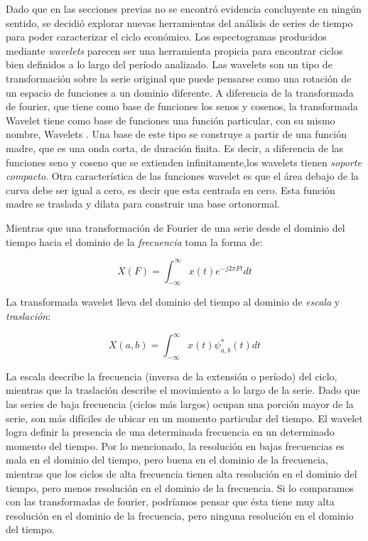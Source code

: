 \documentclass[a4paper]{article}
\begin{document}
Dado que en las secciones previas no se encontró evidencia concluyente en ningún sentido, se decidió explorar nuevas herramientas del análisis de series de tiempo para poder caracterizar el ciclo económico. Los espectogramas producidos mediante \textit{wavelets} parecen ser una herramienta propicia para encontrar ciclos bien definidos a lo largo del período analizado. Las wavelets son un tipo de transformación sobre la serie original que puede pensarse como una rotación de un espacio de funciones a un dominio diferente. A diferencia de la transformada de fourier, que tiene como base de funciones los senos y cosenos, la transformada Wavelet tiene como base de funciones una función particular, con su mismo nombre, Wavelets \cite{castro1995wavelets}. Una base de este tipo se construye a partir de una función madre, que es una onda corta, de duración finita. Es decir, a diferencia de las funciones seno y coseno que se extienden infinitamente,los wavelets tienen \textit{soporte compacto}. Otra característica de las funciones wavelet es que el área debajo de la curva debe ser igual a cero, es decir que esta centrada en cero. Esta función madre se traslada y dilata para construir una base ortonormal. 

Mientras que una transformación de Fourier de una serie desde el dominio del tiempo hacia el dominio de la \textit{frecuencia} toma la forma de:

$$
X(F)=\int_{-\infty}^{\infty} x(t) e^{-j2\pi Ft}dt
$$

La transformada wavelet lleva del dominio del tiempo al dominio de \textit{escala} y \textit{traslación}:

$$
X(a,b)=\int_{-\infty}^{\infty} x(t) \psi^*_{a,b}(t)dt
$$

La escala describe la frecuencia (inversa de la extensión o período) del ciclo, mientras que la traslación describe el movimiento a lo largo de la serie. Dado que las series de baja frecuencia (ciclos más largos) ocupan una porción mayor de la serie, son más difíciles de ubicar en un momento particular del tiempo. El wavelet logra definir la presencia de una determinada frecuencia en un determinado momento del tiempo. Por lo mencionado, la resolución en bajas frecuencias es mala en el dominio del tiempo, pero buena en el dominio de la frecuencia, mientras que los ciclos de alta frecuencia tienen alta resolución en el dominio del tiempo, pero menos resolución en el dominio de la frecuencia. Si lo comparamos con las transformadas de fourier, podríamos pensar que ésta tiene muy alta resolución en el dominio de la frecuencia, pero ninguna resolución en el dominio del tiempo. 
\end{document}
